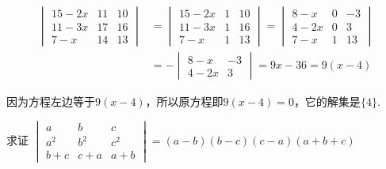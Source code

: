 \begin{solution}
  \[\begin{split}
    \begin{vmatrix}15-2x&11&10\\11-3x&17&16\\7-x&14&13\end{vmatrix}&= \begin{vmatrix}15-2x&1&10\\11-3x&1&16\\7-x&1&13\end{vmatrix}=  \begin{vmatrix}8-x&0&-3\\4-2x&0&3\\7-x&1&13\end{vmatrix}\\
    &=-\begin{vmatrix}8-x&-3\\4-2x&3\end{vmatrix} =9x-36=9(x-4)
  \end{split}\]

因为方程左边等于$9(x-4)$，所以原方程即$9(x-4)=0$，它的解集是$\{4\}$.
\end{solution}

\begin{example}
  求证
$\begin{vmatrix}a&b&c\\a^2&b^2&c^2\\b+c&c+a&a+b\end{vmatrix}=(a-b)(b-c)(c-a)(a+b+c)$
\end{example}


